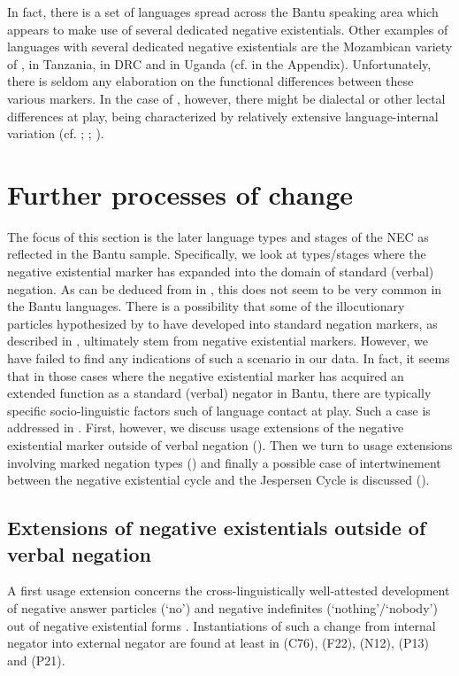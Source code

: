 \documentclass[output=paper]{langscibook}
\begin{document}
%
In fact, there is a set of
languages spread across the Bantu speaking area which appears to make use
of several dedicated negative existentials. Other examples of languages
with several dedicated negative existentials are the Mozambican variety of
,  in Tanzania,  in DRC and  in
Uganda (cf.  in the Appendix). Unfortunately, there is
seldom any elaboration on the functional differences between these various
markers. In the case of , however, there might be dialectal or
other lectal differences at play,  being characterized by
relatively extensive language-internal variation (cf.
\citealt[30--35]{Morrison2011}; \citealt{Morrison2015};
\citealt{Mitterhofer2013}).

\section{Further processes of change}\label{sec:1:6}
%
The focus of this section is the later language types and stages of the NEC
as reflected in the Bantu sample. Specifically, we look at types\slash stages
where the negative existential marker has expanded into the domain of
standard (verbal) negation. As can be deduced from
 in , this does not seem to be 
very common in the Bantu languages. There is a possibility that some
of the illocutionary particles hypothesized by \citet{Guldemann1999} to
have developed into standard negation markers, as described in
, ultimately stem from negative existential markers.
However, we have failed to find any indications of such a scenario in our
data. In fact, it seems that in those cases where the negative existential
marker has acquired an extended function as a standard (verbal) negator in
Bantu, there are typically specific socio-linguistic factors such of
language contact at play. Such a case is addressed in
. First, however, we discuss usage extensions of the
negative existential marker outside of verbal negation
(). Then we turn to usage extensions involving marked
negation types () and finally a possible case of
intertwinement between the negative existential cycle and the Jespersen
Cycle is discussed ().

\subsection{Extensions of negative existentials outside of verbal
negation}\label{sec:1:6.1}
%
A first usage extension concerns the cross-linguistically well-attested
development of negative answer particles (`no') and negative indefinites
(`no\-thing'\slash `no\-bo\-dy') out of negative existential forms
\parencites(see)()
{Schwegler1988}{Croft1991}{Veselinova2013}{Veselinova2014}{Veselinova2016}.
Instantiations of such a change from internal negator into external negator
are found at least in  (C76),  (F22), 
(N12),  (P13) and  (P21).
\end{document}
